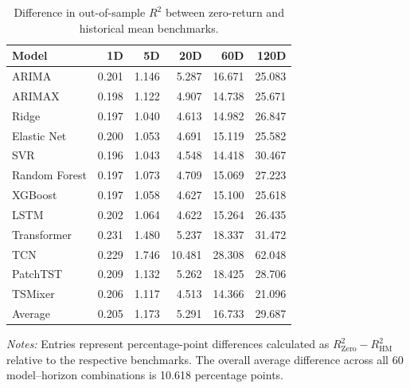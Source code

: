 \documentclass[runningheads,orivec]{llncs}
\begin{document}
\begin{table}[htbp]
\centering
\caption{Difference in out-of-sample $R^2$ between zero-return and historical mean benchmarks.}\label{tab:benchmark_difference}
{\small
\setlength{\tabcolsep}{6pt}
\begin{tabular}{lrrrrr}
\hline
Model & 1D & 5D & 20D & 60D & 120D \\
\hline
ARIMA          & 0.201 & 1.146 &  5.287 & 16.671 & 25.083 \\
ARIMAX         & 0.198 & 1.122 &  4.907 & 14.738 & 25.671 \\
Ridge          & 0.197 & 1.040 &  4.613 & 14.982 & 26.847 \\
Elastic Net    & 0.200 & 1.053 &  4.691 & 15.119 & 25.582 \\
SVR            & 0.196 & 1.043 &  4.548 & 14.418 & 30.467 \\
Random Forest  & 0.197 & 1.073 &  4.709 & 15.069 & 27.223 \\
XGBoost        & 0.197 & 1.058 &  4.627 & 15.100 & 25.618 \\
LSTM           & 0.202 & 1.064 &  4.622 & 15.264 & 26.435 \\
Transformer    & 0.231 & 1.480 &  5.237 & 18.337 & 31.472 \\
TCN            & 0.229 & 1.746 & 10.481 & 28.308 & 62.048 \\
PatchTST       & 0.209 & 1.132 &  5.262 & 18.425 & 28.706 \\
TSMixer        & 0.206 & 1.117 &  4.513 & 14.366 & 21.096 \\
\hline
Average        & 0.205 & 1.173 &  5.291 & 16.733 & 29.687 \\
\hline
\end{tabular}}
\par\vspace{4pt}\parbox{\linewidth}{\linespread{1.2}\selectfont\footnotesize\textit{Notes:} Entries represent percentage-point differences calculated as $R^2_{\mathrm{Zero}} - R^2_{\mathrm{HM}}$ relative to the respective benchmarks. The overall average difference across all 60 model--horizon combinations is 10.618 percentage points.\par}
\end{table}
\end{document}
